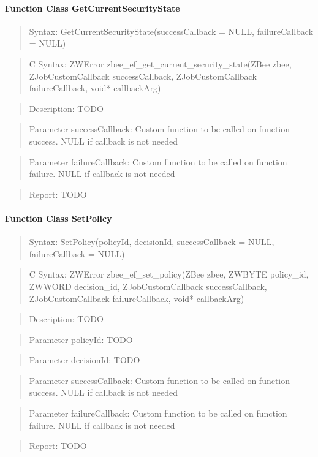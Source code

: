 \paragraph{Function Class GetCurrentSecurityState}
\begin{quote}Syntax: GetCurrentSecurityState(successCallback = NULL, failureCallback = NULL)\end{quote}
\begin{quote}C Syntax: ZWError zbee\_ef\_get\_current\_security\_state(ZBee zbee, ZJobCustomCallback successCallback, ZJobCustomCallback failureCallback, void* callbackArg)\end{quote}
\begin{quote}Description: TODO\end{quote}
\begin{quote}Parameter successCallback: Custom function to be called on function success. NULL if callback is not needed\end{quote}
\begin{quote}Parameter failureCallback: Custom function to be called on function failure. NULL if callback is not needed\end{quote}
\begin{quote}Report: TODO\end{quote}

\paragraph{Function Class SetPolicy}
\begin{quote}Syntax: SetPolicy(policyId, decisionId, successCallback = NULL, failureCallback = NULL)\end{quote}
\begin{quote}C Syntax: ZWError zbee\_ef\_set\_policy(ZBee zbee, ZWBYTE policy\_id, ZWWORD decision\_id, ZJobCustomCallback successCallback, ZJobCustomCallback failureCallback, void* callbackArg)\end{quote}
\begin{quote}Description: TODO\end{quote}
\begin{quote}Parameter policyId: TODO\end{quote}
\begin{quote}Parameter decisionId: TODO\end{quote}
\begin{quote}Parameter successCallback: Custom function to be called on function success. NULL if callback is not needed\end{quote}
\begin{quote}Parameter failureCallback: Custom function to be called on function failure. NULL if callback is not needed\end{quote}
\begin{quote}Report: TODO\end{quote}

